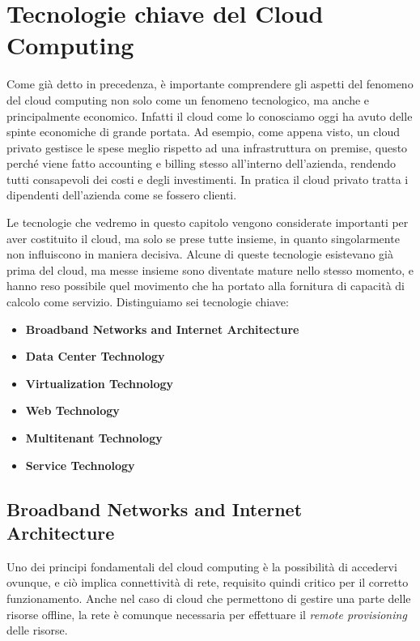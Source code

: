 \chapter{Tecnologie chiave del Cloud Computing}
Come già detto in precedenza, è importante comprendere gli aspetti del fenomeno del cloud computing non solo come un fenomeno tecnologico, ma anche e principalmente economico. Infatti il cloud come lo conosciamo oggi ha avuto delle spinte economiche di grande portata. Ad esempio, come appena visto, un cloud privato gestisce le spese meglio rispetto ad una infrastruttura on premise, questo perché viene fatto accounting e billing stesso all'interno dell'azienda, rendendo tutti consapevoli dei costi e degli investimenti. In pratica il cloud privato tratta i dipendenti dell'azienda come se fossero clienti.

\vspace{5mm}

Le tecnologie che vedremo in questo capitolo vengono considerate importanti per aver costituito il cloud, ma solo se prese tutte insieme, in quanto singolarmente non influiscono in maniera decisiva. Alcune di queste tecnologie esistevano già prima del cloud, ma messe insieme sono diventate mature nello stesso momento, e hanno reso possibile quel movimento che ha portato alla fornitura di capacità di calcolo come servizio. Distinguiamo sei tecnologie chiave:
\begin{itemize}
    \item \textbf{Broadband Networks and Internet Architecture}
    \item \textbf{Data Center Technology}
    \item \textbf{Virtualization Technology}
    \item \textbf{Web Technology}
    \item \textbf{Multitenant Technology}
    \item \textbf{Service Technology}
\end{itemize}
\section{Broadband Networks and Internet Architecture}
Uno dei principi fondamentali del cloud computing è la possibilità di accedervi ovunque, e ciò implica connettività di rete, requisito quindi critico per il corretto funzionamento. Anche nel caso di cloud che permettono di gestire una parte delle risorse offline, la rete è comunque necessaria per effettuare il \textit{remote provisioning} delle risorse.

